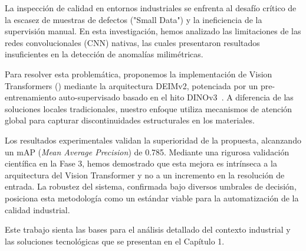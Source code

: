 \begin{resumen}

    La inspección de calidad en entornos industriales se enfrenta al desafío crítico de la escasez de muestras de defectos ("Small Data") y la ineficiencia de la supervisión manual. En esta investigación, hemos analizado las limitaciones de las redes convolucionales (CNN) nativas, las cuales presentaron resultados insuficientes en la detección de anomalías milimétricas. 
    
    Para resolver esta problemática, proponemos la implementación de Vision Transformers (\cite{dosovitskiy2021vit}) mediante la arquitectura DEIMv2, potenciada por un pre-entrenamiento auto-supervisado basado en el hito DINOv3~\cite{simeoni2025dinov3}. A diferencia de las soluciones locales tradicionales, nuestro enfoque utiliza mecanismos de atención global para capturar discontinuidades estructurales en los materiales.
    
    Los resultados experimentales validan la superioridad de la propuesta, alcanzando un mAP (\textit{Mean Average Precision}) de 0.785. Mediante una rigurosa validación científica en la Fase 3, hemos demostrado que esta mejora es intrínseca a la arquitectura del Vision Transformer y no a un incremento en la resolución de entrada. La robustez del sistema, confirmada bajo diversos umbrales de decisión, posiciona esta metodología como un estándar viable para la automatización de la calidad industrial.
    
    Este trabajo sienta las bases para el análisis detallado del contexto industrial y las soluciones tecnológicas que se presentan en el Capítulo 1.
    \end{resumen}
    
